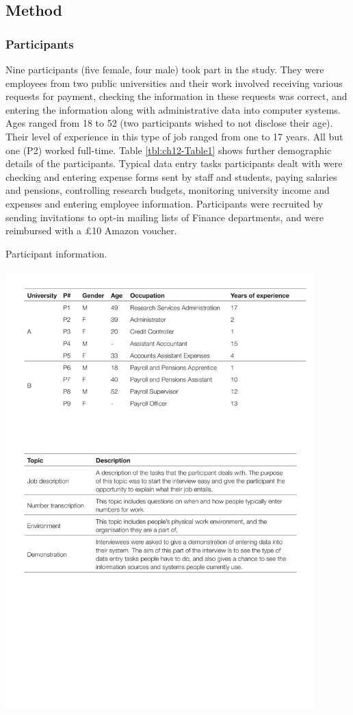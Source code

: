 \subsection{Method}
\subsubsection{Participants}
Nine participants (five female, four male) took part in the study. They were employees from two public universities and their work involved receiving various requests for payment, checking the information in these requests was correct, and entering the information along with administrative data into computer systems. Ages ranged from 18 to 52 (two participants wished to not disclose their age). Their level of experience in this type of job ranged from one to 17 years. All but one (P2) worked full-time. Table \ref{tbl:ch12-Table1} shows further demographic details of the participants. Typical data entry tasks participants dealt with were checking and entering expense forms sent by staff and students, paying salaries and pensions, controlling research budgets, monitoring university income and expenses and entering employee information. Participants were recruited by sending invitations to opt-in mailing lists of Finance departments, and were reimbursed with a \pounds10 Amazon voucher.

\begin{table}
\caption[Study 1 participant information]{Participant information.}
\centering
\includegraphics[width=0.9\textwidth]{images/ch12/ch12_participants.pdf}
\vspace{-3pt}
\label{tbl:ch12-Table1}
\end{table}

